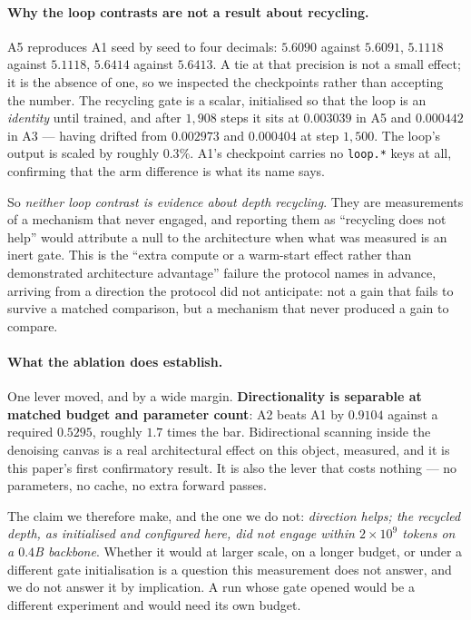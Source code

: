 \documentclass[11pt]{article}
\begin{document}
\paragraph{Why the loop contrasts are not a result about recycling.} A5 reproduces A1 seed
by seed to four decimals: $5.6090$ against $5.6091$, $5.1118$ against $5.1118$, $5.6414$
against $5.6413$. A tie at that precision is not a small effect; it is the absence of one,
so we inspected the checkpoints rather than accepting the number. The recycling gate is a
scalar, initialised so that the loop is an \emph{identity} until trained, and after $1{,}908$
steps it sits at \textbf{$0.003039$} in A5 and \textbf{$0.000442$} in A3 --- having drifted
from $0.002973$ and $0.000404$ at step $1{,}500$. The loop's output is scaled by roughly
$0.3\%$. A1's checkpoint carries no \texttt{loop.*} keys at all, confirming that the arm
difference is what its name says.

So \emph{neither loop contrast is evidence about depth recycling}. They are measurements of
a mechanism that never engaged, and reporting them as ``recycling does not help'' would
attribute a null to the architecture when what was measured is an inert gate. This is the
``extra compute or a warm-start effect rather than demonstrated architecture advantage''
failure the protocol names in advance, arriving from a direction the protocol did not
anticipate: not a gain that fails to survive a matched comparison, but a mechanism that
never produced a gain to compare.

\paragraph{What the ablation does establish.} One lever moved, and by a wide margin.
\textbf{Directionality is separable at matched budget and parameter count}: A2 beats A1 by
$0.9104$ against a required $0.5295$, roughly $1.7$ times the bar. Bidirectional scanning
inside the denoising canvas is a real architectural effect on this object, measured, and it
is this paper's first confirmatory result. It is also the lever that costs nothing --- no
parameters, no cache, no extra forward passes.

The claim we therefore make, and the one we do not: \emph{direction helps; the recycled
depth, as initialised and configured here, did not engage within $2 \times 10^9$ tokens on a
$0.4$B backbone}. Whether it would at larger scale, on a longer budget, or under a different
gate initialisation is a question this measurement does not answer, and we do not answer it
by implication. A run whose gate opened would be a different experiment and would need its
own budget.
\end{document}
